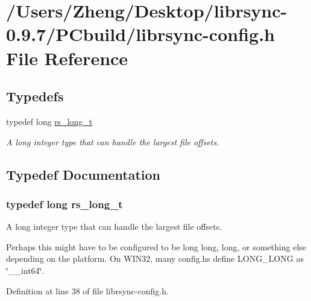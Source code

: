 \hypertarget{_p_cbuild_2librsync-config_8h}{}\section{/\+Users/\+Zheng/\+Desktop/librsync-\/0.9.7/\+P\+Cbuild/librsync-\/config.h File Reference}
\label{_p_cbuild_2librsync-config_8h}
\subsection*{Typedefs}
\begin{DoxyCompactItemize}
\item 
typedef long \hyperlink{_p_cbuild_2librsync-config_8h_ac5c269c6428f5a3a4a89b55151f42795}{rs\+\_\+long\+\_\+t}
\begin{DoxyCompactList}\small\item\em A long integer type that can handle the largest file offsets. \end{DoxyCompactList}\end{DoxyCompactItemize}


\subsection{Typedef Documentation}
\hypertarget{_p_cbuild_2librsync-config_8h_ac5c269c6428f5a3a4a89b55151f42795}{}
\subsubsection[{rs\+\_\+long\+\_\+t}]{\setlength{\rightskip}{0pt plus 5cm}typedef long {\bf rs\+\_\+long\+\_\+t}}\label{_p_cbuild_2librsync-config_8h_ac5c269c6428f5a3a4a89b55151f42795}


A long integer type that can handle the largest file offsets. 

Perhaps this might have to be configured to be \textquotesingle{}long long\textquotesingle{}, \textquotesingle{}long\textquotesingle{}, or something else depending on the platform. On W\+I\+N32, many config.\+h\textquotesingle{}s define L\+O\+N\+G\+\_\+\+L\+O\+N\+G as \char`\"{}\+\_\+\+\_\+int64\char`\"{}. 

Definition at line 38 of file librsync-\/config.\+h.

